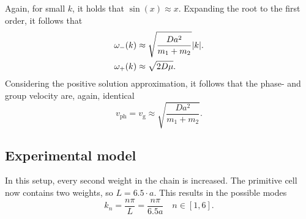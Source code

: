Again, for small $k$, it holds that $\sin(x)\approx x$.
Expanding the root to the first order, it follows that
\begin{align*}
	\omega_{-}(k) &\approx \sqrt{\frac{Da^2}{m_1+m_2}}\abs{k}. \\
	\omega_{+}(k) &\approx \sqrt{2D\mu}.
\end{align*}
Considering the positive solution approximation, it follows that the phase- and group velocity are, again, identical
\begin{equation*}
	v_\text{ph} = v_\text{g}\approx \sqrt{\frac{Da^2}{m_1+m_2}}.
\end{equation*}
\subsection{Experimental model}\label{subsec:exp_mod_alternating}
In this setup, every second weight in the chain is increased.
The primitive cell now contains two weights, so $L=\num{6.5}\cdot a$.
This results in the possible modes
\begin{equation*}
	k_n = \frac{n\pi}{L} = \frac{n\pi}{\num{6.5}a}\quad n\in[1, 6].
\end{equation*}
